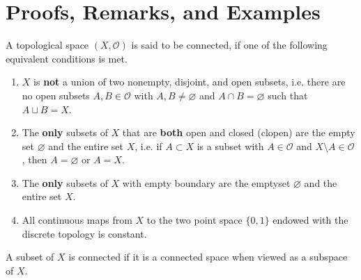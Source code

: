 \section{Proofs, Remarks, and Examples}
\begin{defbox}
    \begin{definition}
        A {\color{mathobj}topological space} \((X, \mathcal{O})\) is said to be {\color{maththen}connected}, if one of the following {\color{mathrem}equivalent} conditions is met.
        \begin{enumerate}
            \item \(X\) is \textbf{not} a {\color{mathif}union} of two {\color{mathif}nonempty}, {\color{mathif}disjoint}, and {\color{mathif} open subsets}, i.e. there are no open subsets \(A, B \in \mathcal{O}\) with \(A, B \neq \varnothing\) and \(A \cap B = \varnothing\) such that \(A \sqcup B = X\).
            \item The \textbf{only} {\color{mathif}subsets} of \(X\) that are \textbf{both} {\color{mathif}open} and {\color{mathif}closed} ({\color{mathrem}clopen}) are the empty set \(\varnothing\) and the entire set \(X\), i.e. if \(A \subset X\) is a subset with \(A \in \mathcal{O}\) and \(X \setminus A \in \mathcal{O}\), then \(A = \varnothing\) or \(A = X\).
            \item The \textbf{only} {\color{mathif}subsets} of \(X\) with empty {\color{mathif}boundary} are the emptyset \(\varnothing\) and the entire set \(X\).
            \item All {\color{mathif}continuous} maps from \(X\) to the two point space \(\{0, 1\}\) endowed with the {\color{mathif}discrete} topology is {\color{mathif}constant}. 
        \end{enumerate}
        A {\color{mathobj}subset} of \(X\) is {\color{maththen}connected} if it is a {\color{mathif}connected space} when viewed as a {\color{mathif}subspace} of \(X\).
    \end{definition}
\end{defbox}
